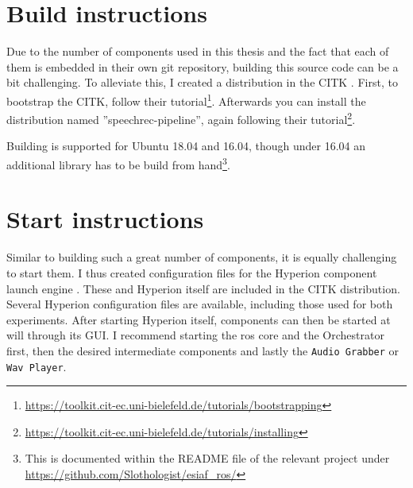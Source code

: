 \section{Build instructions}
Due to the number of components used in this thesis and the fact that each of them is embedded in their own git repository, building this source code can be a bit challenging.
To alleviate this, I created a distribution in the CITK \cite{7759508}.
First, to bootstrap the CITK, follow their tutorial\footnote{\url{https://toolkit.cit-ec.uni-bielefeld.de/tutorials/bootstrapping}}.
Afterwards you can install the distribution named ''speechrec-pipeline'', again following their tutorial\footnote{\url{https://toolkit.cit-ec.uni-bielefeld.de/tutorials/installing}}.


Building is supported for Ubuntu 18.04 and 16.04, though under 16.04 an additional library has to be build from hand\footnote{This is documented within the README file of the relevant project under \url{https://github.com/Slothologist/esiaf_ros/}}.


\section{Start instructions}

Similar to building such a great number of components, it is equally challenging to start them.
I thus created configuration files for the Hyperion component launch engine \cite{hyperion}.
These and Hyperion itself are included in the CITK distribution.
Several Hyperion configuration files are available, including those used for both experiments.
After starting Hyperion itself, components can then be started at will through its GUI.
I recommend starting the \gls{ros} core and the Orchestrator first, then the desired intermediate components and lastly the \texttt{Audio Grabber} or \texttt{Wav Player}.